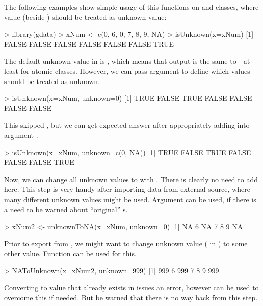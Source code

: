 \documentclass[a4paper]{report}
\begin{document}
\begin{article}
The following examples show simple usage of this functions on
 and  classes, where value  (beside
) should be treated as unknown value:

\begin{smallverbatim}
> library(gdata)
> xNum <- c(0, 6, 0, 7, 8, 9, NA)
> isUnknown(x=xNum)
[1] FALSE FALSE FALSE FALSE FALSE FALSE  TRUE
\end{smallverbatim}

The default unknown value in  is , which means
that output is the same to  - at least for atomic
classes. However, we can pass argument  to define which
values should be treated as unknown.

\begin{smallverbatim}
> isUnknown(x=xNum, unknown=0)
[1]  TRUE FALSE  TRUE FALSE FALSE FALSE FALSE
\end{smallverbatim}

This skipped , but we can get expected answer after appropriately
adding  into argument .

\begin{smallverbatim}
> isUnknown(x=xNum, unknown=c(0, NA))
[1]  TRUE FALSE  TRUE FALSE FALSE FALSE  TRUE
\end{smallverbatim}

Now, we can change all unknown values to  with .
There is clearly no need to add  here. This step is very handy
after importing data from external source, where many different unknown
values might be used. Argument  can be used, if there is
a need to be warned about ``original'' s.

\begin{smallverbatim}
> xNum2 <- unknownToNA(x=xNum, unknown=0)
[1] NA  6 NA  7  8  9 NA
\end{smallverbatim}

Prior to export from \R{}, we might want to change unknown value (
in \R{}) to some other value. Function  can be used for
this.

\begin{smallverbatim}
> NAToUnknown(x=xNum2, unknown=999)
[1] 999   6 999   7   8   9 999
\end{smallverbatim}

Converting  to value that already exists in  issues an
error, however  can be used to overcome this if
needed. But be warned that there is no way back from this step.


\end{article}
\end{document}
